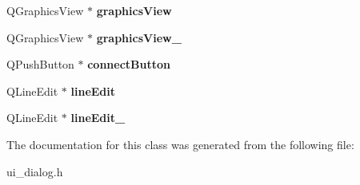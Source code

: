 \begin{DoxyCompactItemize}
\item 
Q\+Graphics\+View $\ast$ {\bfseries graphics\+View}\hypertarget{classUi__Dialog_a95e25d36a940c3e3e4a684c7dea1dece}{}\label{classUi__Dialog_a95e25d36a940c3e3e4a684c7dea1dece}

\item 
Q\+Graphics\+View $\ast$ {\bfseries graphics\+View\+\_}\hypertarget{classUi__Dialog_a5b59afbca526fd4ea01b2c95e9e5e806}{}\label{classUi__Dialog_a5b59afbca526fd4ea01b2c95e9e5e806}

\item 
Q\+Push\+Button $\ast$ {\bfseries connect\+Button}\hypertarget{classUi__Dialog_acc4ad2f01e82ca9c9c1f1c355d58d679}{}\label{classUi__Dialog_acc4ad2f01e82ca9c9c1f1c355d58d679}

\item 
Q\+Line\+Edit $\ast$ {\bfseries line\+Edit}\hypertarget{classUi__Dialog_a934cf16b9b36614a93f04261c652c1c7}{}\label{classUi__Dialog_a934cf16b9b36614a93f04261c652c1c7}

\item 
Q\+Line\+Edit $\ast$ {\bfseries line\+Edit\+\_}\hypertarget{classUi__Dialog_a207c1cd87b6977d61f5e4c77d341ca26}{}\label{classUi__Dialog_a207c1cd87b6977d61f5e4c77d341ca26}

\end{DoxyCompactItemize}


The documentation for this class was generated from the following file\+:\begin{DoxyCompactItemize}
\item 
ui\+\_\+dialog.\+h\end{DoxyCompactItemize}
